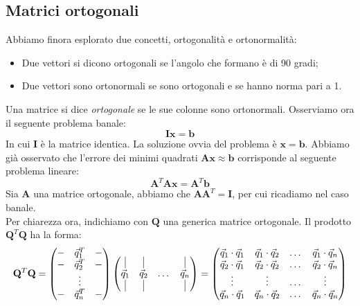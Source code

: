 \documentclass{article}
\begin{document}
        \subsection{Matrici ortogonali}
            Abbiamo finora esplorato due concetti, ortogonalità e ortonormalità:
            \begin{itemize}
                \item Due vettori si dicono ortogonali se l'angolo che formano è di 90 gradi;
                \item Due vettori sono ortonormali se sono ortogonali e se hanno norma pari a 1.
            \end{itemize}
            Una matrice si dice \emph{ortogonale} se le sue colonne sono ortonormali. Osserviamo ora il seguente problema banale:
            \[\mathbf{Ix} = \mathbf{b}\]
            In cui $\mathbf{I}$ è la matrice identica. La soluzione ovvia del problema è $\mathbf{x} = \mathbf{b}$. Abbiamo già osservato che 
            l'errore dei minimi quadrati $\mathbf{Ax} \approx \mathbf{b}$ corrisponde al seguente problema lineare:
            \[\mathbf{A}^T\mathbf{Ax} = \mathbf{A}^T\mathbf{b}\]
            Sia $\mathbf{A}$ una matrice ortogonale, abbiamo che $\mathbf{AA}^T = \mathbf{I}$, per cui ricadiamo nel caso banale.\\
            Per chiarezza ora, indichiamo con $\mathbf{Q}$ una generica matrice ortogonale. Il prodotto $\mathbf{Q}^T\mathbf{Q}$ ha la forma:
            \[\mathbf{Q}^T\mathbf{Q} = \begin{pmatrix}
                - & \vec{q}_1^T & - \\
                - & \vec{q}_2^T & - \\
                & \vdots & \\
                - & \vec{q}_n^T & - \\
            \end{pmatrix} \begin{pmatrix}
                \vline & \vline & & \vline \\
                \vec{q}_1 & \vec{q}_2 & \dots & \vec{q}_n \\
                \vline & \vline & & \vline
            \end{pmatrix} = \begin{pmatrix}
                \vec{q}_1 \cdot \vec{q}_1 & \vec{q}_1 \cdot \vec{q}_2 & \dots & \vec{q}_1 \cdot \vec{q}_n \\
                \vec{q}_2 \cdot \vec{q}_1 & \vec{q}_2 \cdot \vec{q}_2 & \dots & \vec{q}_2 \cdot \vec{q}_n \\
                \vdots & \vdots & \dots & \vdots \\
                \vec{q}_n \cdot \vec{q}_1 & \vec{q}_n \cdot \vec{q}_2 & \dots & \vec{q}_n \cdot \vec{q}_n \\
            \end{pmatrix}\]
\end{document}
